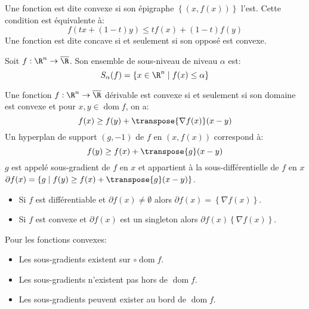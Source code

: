 \documentclass[math]{cours}
\DeclareMathOperator{\dom}{dom}
\begin{document}
\begin{definition}
	Une fonction est dite convexe si son épigraphe $\left\{ (x, f(x)) \right\}$ l'est.
	Cette condition est équivalente à:
	\begin{equation*}
		f\left( tx + \left( 1 - t \right)y \right) \leq tf(x) + (1 - t) f(y)
	\end{equation*}
	Une fonction est dite concave si et seulement si son opposé est convexe.
\end{definition}

\begin{definition}
	Soit $f : \R^{n} \to \overline{\R}$.
	Son ensemble de sous-niveau de niveau $\alpha$ est:
	\begin{equation*}
		S_{\alpha} (f) = \left\{ x \in \R^{n} \mid f(x) \leq \alpha \right\}
	\end{equation*}
\end{definition}

\begin{proposition}
	Une fonction $f : \R^{n} \to \overline{\R}$ dérivable est convexe si et seulement si son domaine est convexe et pour $x, y \in \dom f$, on a:
	\begin{equation*}
		f(x) \geq f(y) + \transpose{\nabla f(x)} (x - y)
	\end{equation*}
	Un hyperplan de support $(g, -1)$ de $f$ en $(x, f(x))$ correspond à:
	\begin{equation*}
		f(y) \geq f(x) + \transpose{g}(x - y)
	\end{equation*}
	$g$ est appelé sous-gradient de $f$ en $x$ et appartient à la sous-différentielle de $f$ en $x$ $\partial f(x) = \left\{ g \mid f(y) \geq f(x) + \transpose{g}(x - y)\right\}$.
	\begin{itemize}
		\item Si $f$ est différentiable et $\partial f(x) \neq \emptyset$ alors $\partial f(x) = \left\{ \nabla f(x) \right\}$.
		\item Si $f$ est convexe et $\partial f(x)$ est un singleton alors $\partial f(x) \left\{ \nabla f(x) \right\}$.
	\end{itemize}
	Pour les fonctions convexes:
	\begin{itemize}
		\item Les sous-gradients existent sur $\circ{\dom f}$.
		\item Les sous-gradients n'existent pas hors de $\dom f$.
		\item Les sous-gradients peuvent exister au bord de $\dom f$.
	\end{itemize}
\end{proposition}
\end{document}
